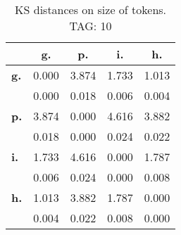 \begin{table}[h!]
\begin{center}
\begin{tabular}{| l || c | c | c | c |}\hline
 & {\bf g.} & {\bf p.} & {\bf i.} & {\bf h.} \\\hline\hline
{\bf g.} & 0.000 & 3.874 & 1.733 & 1.013 \\
{\bf } & 0.000 & 0.018 & 0.006 & 0.004 \\\hline
{\bf p.} & 3.874 & 0.000 & 4.616 & 3.882 \\
{\bf } & 0.018 & 0.000 & 0.024 & 0.022 \\\hline
{\bf i.} & 1.733 & 4.616 & 0.000 & 1.787 \\
{\bf } & 0.006 & 0.024 & 0.000 & 0.008 \\\hline
{\bf h.} & 1.013 & 3.882 & 1.787 & 0.000 \\
{\bf } & 0.004 & 0.022 & 0.008 & 0.000 \\\hline
\end{tabular}
\caption{KS distances on size of tokens. TAG: 10}
\end{center}
\end{table}